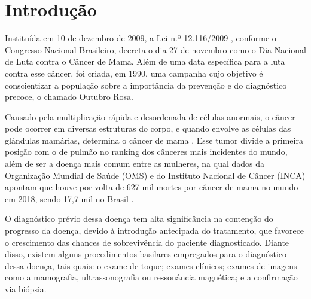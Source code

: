 \section{\esp Introdução}

Instituída em 10 de dezembro de 2009, a Lei n.º 12.116/2009 , conforme o Congresso Nacional Brasileiro, decreta o dia 27 de novembro como o Dia Nacional de Luta contra o Câncer de Mama. Além de uma data específica para a luta contra esse câncer, foi criada, em 1990, uma campanha cujo objetivo é conscientizar a população sobre a importância da prevenção e do diagnóstico precoce, o chamado Outubro Rosa.

Causado pela multiplicação rápida e desordenada de células anormais, o câncer pode ocorrer em diversas estruturas do corpo, e quando envolve as células das glândulas mamárias, determina o câncer de mama \cite{incaoquee}. Esse tumor divide a primeira posição com o de pulmão no ranking dos cânceres mais incidentes do mundo, além de ser a doença mais comum entre as mulheres, na qual dados da Organização Mundial de Saúde (OMS) e do Instituto Nacional de Câncer (INCA) apontam que houve por volta de 627 mil mortes por câncer de mama no mundo em 2018, sendo 17,7 mil no Brasil \cite{boletimepidemiologico}.

O diagnóstico prévio dessa doença tem alta significância na contenção do progresso da doença, devido à introdução antecipada do tratamento, que favorece o crescimento das chances de sobrevivência do paciente diagnosticado. Diante disso, existem alguns procedimentos basilares empregados para o diagnóstico dessa doença, tais quais: o exame de toque; exames clínicos; exames de imagens como a mamografia, ultrassonografia ou ressonância magnética; e a confirmação via biópsia.

